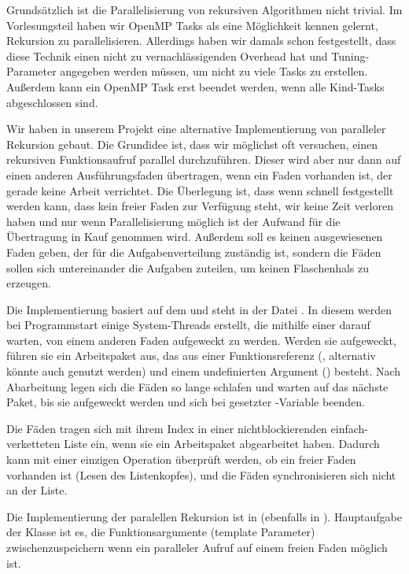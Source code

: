 Grundsätzlich ist die Parallelisierung von rekursiven Algorithmen nicht trivial. Im Vorlesungsteil haben wir OpenMP Tasks als eine Möglichkeit kennen gelernt, Rekursion zu parallelisieren. Allerdings haben wir damals schon festgestellt, dass diese Technik einen nicht zu vernachlässigenden Overhead hat und Tuning-Parameter angegeben werden müssen, um nicht zu viele Tasks zu erstellen. Außerdem kann ein OpenMP Task erst beendet werden, wenn alle Kind-Tasks abgeschlossen sind.

Wir haben in unserem Projekt eine alternative Implementierung von paralleler Rekursion gebaut. Die Grundidee ist, dass wir möglichst oft versuchen, einen rekursiven Funktionsaufruf parallel durchzuführen. Dieser wird aber nur dann auf einen anderen Ausführungsfaden übertragen, wenn ein Faden vorhanden ist, der gerade keine Arbeit verrichtet. Die Überlegung ist, dass wenn schnell festgestellt werden kann, dass kein freier Faden zur Verfügung steht, wir keine Zeit verloren haben und nur wenn Parallelisierung möglich ist der Aufwand für die Übertragung in Kauf genommen wird. Außerdem soll es keinen ausgewiesenen Faden geben, der für die Aufgabenverteilung zuständig ist, sondern die Fäden sollen sich untereinander die Aufgaben zuteilen, um keinen Flaschenhals zu erzeugen.

Die Implementierung basiert auf dem  und steht in der Datei . In diesem werden bei Programmstart einige System-Threads erstellt, die mithilfe einer  darauf warten, von einem anderen Faden aufgeweckt zu werden. Werden sie aufgeweckt, führen sie ein Arbeitspaket aus, das aus einer Funktionsreferenz (, alternativ könnte auch  genutzt werden) und einem undefinierten Argument () besteht. Nach Abarbeitung legen sich die Fäden so lange schlafen und warten auf das nächste Paket, bis sie aufgeweckt werden und sich bei gesetzter -Variable beenden.

Die Fäden tragen sich mit ihrem Index in einer nichtblockierenden einfach-verketteten Liste ein, wenn sie ein Arbeitspaket abgearbeitet haben. Dadurch kann mit einer einzigen Operation überprüft werden, ob ein freier Faden vorhanden ist (Lesen des Listenkopfes), und die Fäden synchronisieren sich nicht an der Liste.

Die Implementierung der paralellen Rekursion ist in  (ebenfalls in ). Hauptaufgabe der Klasse ist es, die Funktionsargumente (template Parameter) zwischenzuspeichern wenn ein paralleler Aufruf auf einem freien Faden möglich ist.

